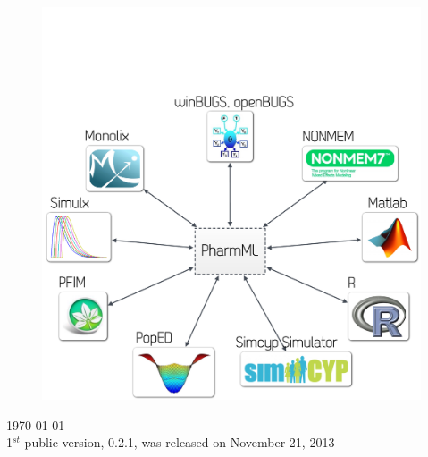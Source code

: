 \begin{titlepage}
\begin{center}
%
%
\begin{figure}[htb]
\centering
  \includegraphics[width=0.60\linewidth]{pics/coverFigure}
 \label{fig:platformDDMoRe}
\end{figure}


\vfill

{\large \today \\}
{1$^{st}$ public version, 0.2.1, was released on November 21, 2013}

\end{center}
\end{titlepage}